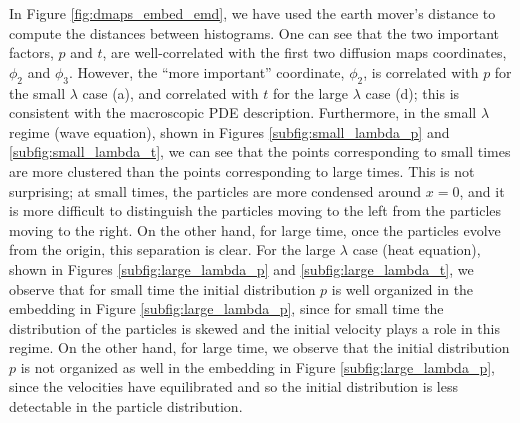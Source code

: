 \documentclass[prl, reprint, final, showkeys]{revtex4-1}
\begin{document}
In Figure \ref{fig:dmaps_embed_emd}, we have used the earth mover's distance to compute the distances between histograms.
%
One can see that the two important factors, $p$ and $t$, are well-correlated with the first two diffusion maps coordinates, $\phi_2$ and $\phi_3$. 
%
However, the ``more important'' coordinate, $\phi_2$, is correlated with $p$ for the small $\lambda$ case (a), and correlated with $t$ for the large $\lambda$ case (d); 
this is consistent with the macroscopic PDE description.
%
Furthermore, in the small $\lambda$ regime (wave equation), shown in Figures \ref{subfig:small_lambda_p} and \ref{subfig:small_lambda_t},
we can see that the points corresponding to small times are more clustered than the points corresponding to large times.
%
This is not surprising; at small times, the particles are more condensed around $x=0$, and it is more difficult to distinguish the particles moving to the left from the particles moving to the right. 
%
On the other hand, for large time, once the particles evolve from the origin, this separation is clear.  
%
For the large $\lambda$ case (heat equation), shown in Figures \ref{subfig:large_lambda_p} and \ref{subfig:large_lambda_t}, we observe that for small time the initial distribution $p$ is well organized in the embedding in Figure \ref{subfig:large_lambda_p}, since for small time the distribution of the particles is skewed and the initial velocity plays a role in this regime. 
%
On the other hand, for large time, we observe that the initial distribution $p$ is not organized as well in the embedding in Figure \ref{subfig:large_lambda_p}, since the velocities have equilibrated and so the initial distribution is less detectable in the particle distribution.
\end{document}
